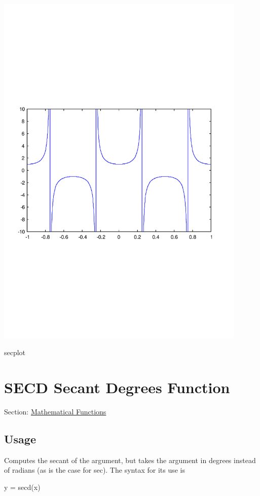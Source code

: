  
\begin{DoxyImage}
\includegraphics[width=12cm]{secplot}
\caption{secplot}
\end{DoxyImage}
 \hypertarget{mathfunctions_secd}{}\section{S\-E\-C\-D Secant Degrees Function}\label{mathfunctions_secd}
Section\-: \hyperlink{sec_mathfunctions}{Mathematical Functions} \hypertarget{vtkwidgets_vtkxyplotwidget_Usage}{}\subsection{Usage}\label{vtkwidgets_vtkxyplotwidget_Usage}
Computes the secant of the argument, but takes the argument in degrees instead of radians (as is the case for {\ttfamily sec}). The syntax for its use is \begin{DoxyVerb}   y = secd(x)
\end{DoxyVerb}
